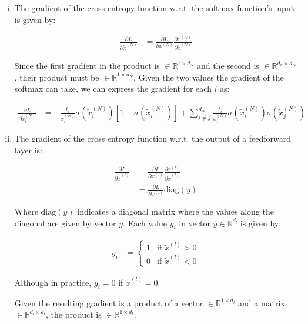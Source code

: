 \documentclass{article}
\begin{document}
\begin{enumerate}[i.]
  \item The gradient of the cross entropy function w.r.t. the softmax function's input is given by:

  \begin{align*}
    \frac{\partial L}{\partial \tilde{x}^{(N)}} &= \frac{\partial L}{\partial x^{(N)}} \frac{\partial x^{(N)}}{\partial \tilde{x}^{(N)}}
  \end{align*}

  Since the first gradient in the product is $\in \mathbb{R}^{1 \times d_N}$ and the second is $\in \mathbb{R}^{d_n \times d_N}$, their product must be $\in \mathbb{R}^{1 \times d_N}$. Given the two values the gradient of the softmax can take, we can express the gradient for each $i$ as:

  \begin{align*}
    \frac{\partial L}{\partial \tilde{x}_i^{(N)}} &= - \frac{t_i}{x_i^{(N)}} \sigma(\tilde{x}_i^{(N)})\left[ 1 - \sigma(\tilde{x}_i^{(N)}) \right] + \sum_{i \neq j}^{d_N} \frac{t_i}{x_i^{(N)}} \sigma(\tilde{x}_i^{(N)}) \sigma(\tilde{x}_j^{(N)})
  \end{align*}

  \item The gradient of the cross entropy function w.r.t. the output of a feedforward layer is:

  \begin{align*}
    \frac{\partial L}{\partial \tilde{x}^{(l)}} &= \frac{\partial L}{\partial x^{(l)}} \frac{\partial x^{(l)}}{\partial \tilde{x}^{(l)}} \\
    &= \frac{\partial L}{\partial x^{(l)}} \text{diag}(y)
  \end{align*}

  Where $\text{diag}(y)$ indicates a diagonal matrix where the values along the diagonal are given by vector $y$. Each value $y_i$ in vector $y \in \mathbb{R}^{d_l}$ is given by:

  \begin{align*}
    y_i &=
    \begin{cases}
      1 & \text{if } \tilde{x}^{(l)} > 0 \\
      0 & \text{if } \tilde{x}^{(l)} < 0
    \end{cases}
  \end{align*}

  Although in practice, $y_i = 0$ if $\tilde{x}^{(l)} = 0$.

  Given the resulting gradient is a product of a vector $\in \mathbb{R}^{1 \times d_l}$ and a matrix $\in \mathbb{R}^{d_l \times d_l}$, the product is $\in \mathbb{R}^{1 \times d_l}$.


\end{enumerate}
\end{document}
